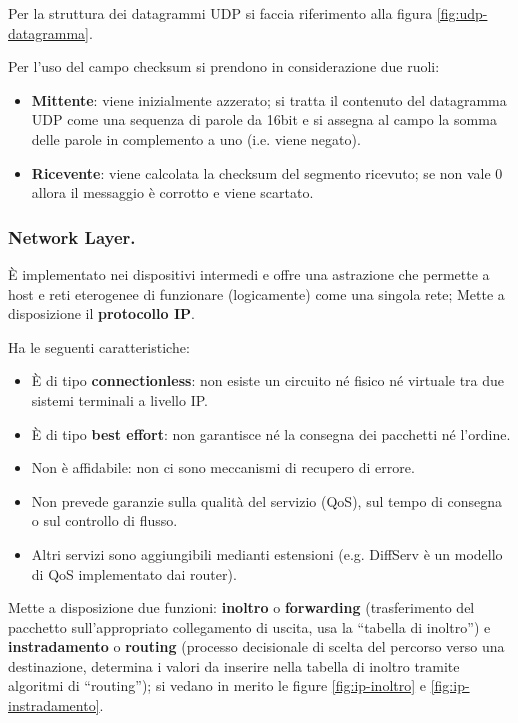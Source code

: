 \documentclass[11pt, italian, openany]{book}
\begin{document}
\begin{sloppypar}
\begin{itemize}[topsep=0pt, itemsep=0pt, parsep=0pt]
	Per la struttura dei datagrammi UDP si faccia riferimento alla figura \ref{fig:udp-datagramma}.

	Per l'uso del campo checksum si prendono in considerazione due ruoli:
	\begin{itemize}[topsep=0pt, itemsep=0pt]
		\item \textbf{Mittente}: viene inizialmente azzerato; si tratta il contenuto del datagramma UDP come una sequenza di parole da 16bit e si assegna al
		campo la somma delle parole in complemento a uno (i.e. viene negato).
		\item \textbf{Ricevente}: viene calcolata la checksum del segmento ricevuto; se non vale 0 allora il messaggio \`e corrotto e viene scartato.
	\end{itemize}
\end{itemize}

\subsubsection{Network Layer.}
\`E implementato nei dispositivi intermedi e offre una astrazione che permette a host e reti eterogenee di funzionare (logicamente) come una singola rete;
Mette a disposizione il \textbf{protocollo IP}.
{}
Ha le seguenti caratteristiche:
\begin{itemize}[topsep=0pt, parsep=0pt, itemsep=0pt]
	\item \`E di tipo \textbf{connectionless}: non esiste un circuito n\'e fisico n\'e virtuale tra due sistemi terminali a livello IP.
	\item \`E di tipo \textbf{best effort}: non garantisce n\'e la consegna dei pacchetti n\'e l'ordine.
	\item Non \`e affidabile: non ci sono meccanismi di recupero di errore.
	\item Non prevede garanzie sulla qualit\`a del servizio (QoS), sul tempo di consegna o sul controllo di flusso.
	\item Altri servizi sono aggiungibili medianti estensioni (e.g. DiffServ \`e un modello di QoS implementato dai router).
\end{itemize}

Mette a disposizione due funzioni: \textbf{inoltro} o \textbf{forwarding} (trasferimento del pacchetto sull'appropriato collegamento di uscita, usa la ``tabella
di inoltro'') e \textbf{instradamento} o \textbf{routing} (processo decisionale di scelta del percorso verso una destinazione, determina i valori da inserire
nella tabella di inoltro tramite algoritmi di ``routing''); si vedano in merito le figure \ref{fig:ip-inoltro} e \ref{fig:ip-instradamento}.


\end{sloppypar}
\end{document}
